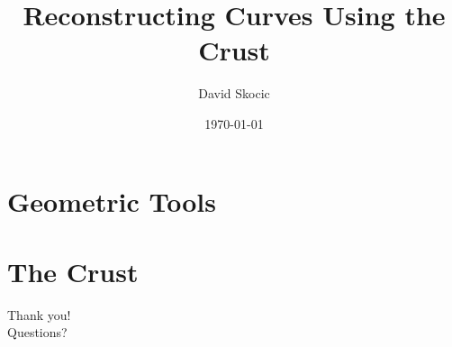 \documentclass{beamer}
\title{Reconstructing Curves Using the Crust}
\author{David Skocic}
\date{\today}
\begin{document}
\maketitle


\section{Geometric Tools}













\section{The Crust}







\begin{frame}
	\centering
	\Huge Thank you! \\
	\vspace{1em}
	\Large Questions?
\end{frame}
\end{document}
